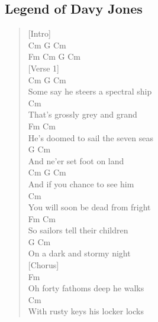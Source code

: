 \documentclass[11pt]{article}
\begin{document}
\subsection{Legend of Davy Jones}
\label{sec:org6ce886b}
\begin{verse}
[Intro]\\
Cm  G  Cm\\
Fm  Cm G   Cm\\
\vspace*{1em}
\vspace*{1em}
[Verse 1]\\
\hspace*{5em}Cm     G        Cm\\
Some say he steers a spectral ship\\
\hspace*{7em}Cm\\
That's grossly grey and grand\\
\hspace*{5em}Fm                 Cm\\
He's doomed to sail the seven seas\\
\hspace*{4em}G                 Cm\\
And ne'er set foot on land\\
\vspace*{1em}
\hspace*{4em}Cm     G         Cm\\
And if you chance to see him\\
\hspace*{9em}Cm\\
You will soon be dead from fright\\
\hspace*{3em}Fm                 Cm\\
So sailors tell their children\\
\hspace*{5em}G               Cm\\
On a dark and stormy night\\
\vspace*{1em}
\vspace*{1em}
[Chorus]\\
\hspace*{3em}Fm\\
Oh forty fathoms deep he walks\\
\hspace*{5em}Cm\\
With rusty keys his locker locks\\

\end{verse}
\end{document}
